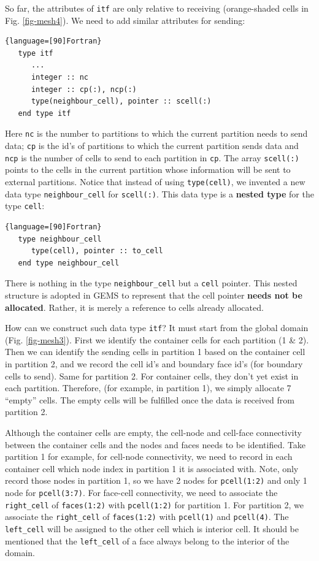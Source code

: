 \documentclass[12pt, letterpaper]{report}
\begin{document}
So far, the attributes of \verb+itf+ are only relative to receiving (orange-shaded cells in Fig. \ref{fig-mesh4}). We need to add similar attributes for sending:

\begin{lstlisting}{language=[90]Fortran}
   type itf
      ...
      integer :: nc
      integer :: cp(:), ncp(:)
      type(neighbour_cell), pointer :: scell(:)
   end type itf
\end{lstlisting}

Here \verb+nc+ is the number to partitions to which the current partition needs to send data;
\verb+cp+ is the id's of partitions to which the current partition sends data and \verb+ncp+ is the
number of cells to send to each partition in \verb+cp+. The array \verb+scell(:)+ points to the
cells in the current partition whose information will be sent to external partitions. Notice that
instead of using \verb+type(cell)+, we invented a new data type \verb+neighbour_cell+ for
\verb+scell(:)+. This data type is a {\bf nested type} for the type \verb+cell+:

\begin{lstlisting}{language=[90]Fortran}
   type neighbour_cell
      type(cell), pointer :: to_cell
   end type neighbour_cell
\end{lstlisting}

There is nothing in the type \verb+neighbour_cell+ but a \verb+cell+ pointer. This nested structure
is adopted in GEMS to represent that the cell pointer {\bf needs not be allocated}. Rather, it is
merely a reference to cells already allocated.
\paraspace

How can we construct such data type \verb+itf+? It must start from the global domain (Fig.
\ref{fig-mesh3}). First we identify the container cells for each partition (1 \& 2). Then we can
identify the sending cells in partition 1 based on the container cell in partition 2, and we record
the cell id's and boundary face id's (for boundary cells to send). Same for partition 2. For
container cells, they don't yet exist in each partition. Therefore, (for example, in partition 1), we simply
allocate 7 ``empty'' cells. The empty cells will be fulfilled once the data is received from
partition 2.
\paraspace

Although the container cells are empty, the cell-node and cell-face connectivity between the
container cells and the nodes and faces needs to be identified. Take partition 1 for example, for
cell-node connectivity, we need to record in each container cell which node index in partition 1 it
is associated with. Note, only record those nodes in partition 1, so we have 2 nodes for
\verb+pcell(1:2)+ and only 1 node for \verb+pcell(3:7)+. For face-cell connectivity, we need to
associate the \verb+right_cell+ of \verb+faces(1:2)+ with \verb+pcell(1:2)+ for partition 1. For
partition 2, we associate the \verb+right_cell+ of \verb+faces(1:2)+ with \verb+pcell(1)+ and
\verb+pcell(4)+. The \verb+left_cell+ will be assigned to the other cell which is interior cell. It
should be mentioned that the \verb+left_cell+ of a face always belong to the interior of the domain.
\paraspace
\end{document}
